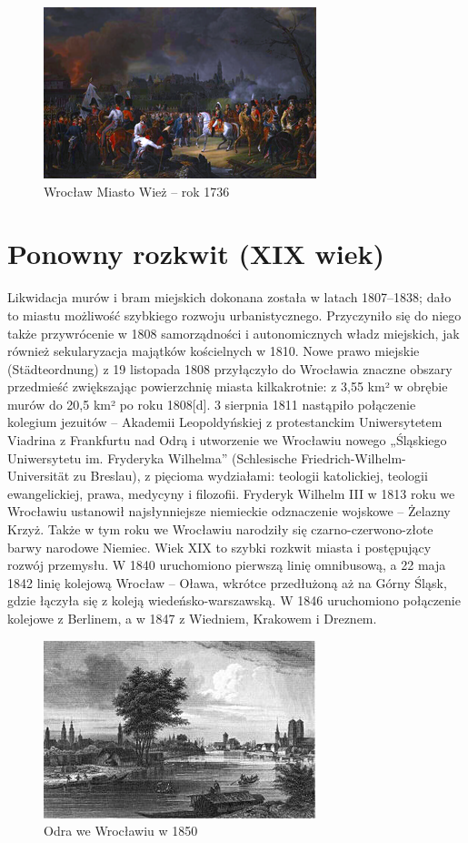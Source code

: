 \documentclass{article}
\begin{document}
\bigskip
\newline
\begin{figure}[h!]
\centering
\includegraphics[scale=2]{7.PNG}
\caption{Wrocław Miasto Wież – rok 1736}
\end{figure}
\newpage
\section{Ponowny rozkwit (XIX wiek)}
Likwidacja murów i bram miejskich dokonana została w latach 1807–1838; dało to miastu możliwość szybkiego rozwoju urbanistycznego. Przyczyniło się do niego także przywrócenie w 1808 samorządności i autonomicznych władz miejskich, jak również sekularyzacja majątków kościelnych w 1810. Nowe prawo miejskie (Städteordnung) z 19 listopada 1808 przyłączyło do Wrocławia znaczne obszary przedmieść zwiększając powierzchnię miasta kilkakrotnie: z 3,55 km² w obrębie murów do 20,5 km² po roku 1808[d]. 3 sierpnia 1811 nastąpiło połączenie kolegium jezuitów – Akademii Leopoldyńskiej z protestanckim Uniwersytetem Viadrina z Frankfurtu nad Odrą i utworzenie we Wrocławiu nowego „Śląskiego Uniwersytetu im. Fryderyka Wilhelma” (Schlesische Friedrich-Wilhelm-Universität zu Breslau), z pięcioma wydziałami: teologii katolickiej, teologii ewangelickiej, prawa, medycyny i filozofii. Fryderyk Wilhelm III w 1813 roku we Wrocławiu ustanowił najsłynniejsze niemieckie odznaczenie wojskowe – Żelazny Krzyż. Także w tym roku we Wrocławiu narodziły się czarno-czerwono-złote barwy narodowe Niemiec. Wiek XIX to szybki rozkwit miasta i postępujący rozwój przemysłu. W 1840 uruchomiono pierwszą linię omnibusową, a 22 maja 1842 linię kolejową Wrocław – Oława, wkrótce przedłużoną aż na Górny Śląsk, gdzie łączyła się z koleją wiedeńsko-warszawską. W 1846 uruchomiono połączenie kolejowe z Berlinem, a w 1847 z Wiedniem, Krakowem i Dreznem.
\begin{figure}[h]
\centering
\includegraphics[scale=1.3]{8.jpg}
\caption{Odra we Wrocławiu w 1850}
\end{figure}
\end{document}
